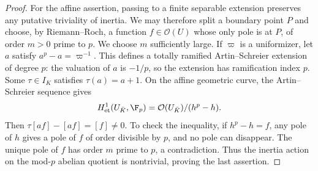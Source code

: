 \begin{proof}
For the affine assertion, passing to a finite separable extension
preserves any putative triviality of inertia. We may therefore split a
boundary point $P$ and choose, by Riemann--Roch, a function
$f\in\mathcal O(U)$ whose only pole is at $P$, of order $m>0$ prime
to $p$. We choose $m$ sufficiently large. If $\varpi$ is a uniformizer,
let $a$ satisfy $a^p-a=\varpi^{-1}$. This defines a totally ramified
Artin--Schreier extension of degree $p$: the valuation of $a$ is
$-1/p$, so the extension has ramification index $p$. Some
$\tau\in I_K$ satisfies $\tau(a)=a+1$. On the affine geometric curve,
the Artin--Schreier sequence gives
\[
 H^1_{\mathrm{et}}(U_{\bar K},\F_p)
 =\mathcal O(U_{\bar K})/(h^p-h).
\]
Then $\tau[af]-[af]=[f]\ne0$. To check the inequality, if
$h^p-h=f$, any pole of $h$ gives a pole of $f$ of order divisible by
$p$, and no pole can disappear. The unique pole of $f$ has order $m$
prime to $p$, a contradiction. Thus the inertia action on the mod-$p$
abelian quotient is nontrivial, proving the last assertion.
\end{proof}

